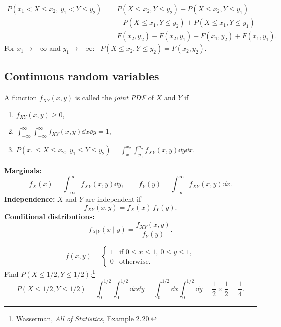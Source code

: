 \begin{center}
\end{center}
\begin{align*}
P(x_1 < X \le x_2,\ y_1 < Y \le y_2) &= P(X \le x_2, Y \le y_2) - P(X \le x_2, Y \le y_1)\\
&\quad - P(X \le x_1, Y \le y_2) + P(X \le x_1, Y \le y_1)\\
&= F(x_2, y_2) - F(x_2, y_1) - F(x_1, y_2) + F(x_1, y_1).
\end{align*}
For $x_1 \to -\infty$ and $y_1 \to -\infty$: \ $P(X \le x_2, Y \le y_2) = F(x_2, y_2)$.

\subsection{Continuous random variables}
A function $f_{XY}(x,y)$ is called the \emph{joint PDF} of $X$ and $Y$ if
\begin{enumerate}[label=(\roman*)]
\item $f_{XY}(x,y) \ge 0$,
\item $\displaystyle\int_{-\infty}^{\infty}\int_{-\infty}^{\infty} f_{XY}(x,y)\dd x\dd y = 1$,
\item $\displaystyle P(x_1 \le X \le x_2,\ y_1 \le Y \le y_2) = \int_{x_1}^{x_2}\int_{y_1}^{y_2} f_{XY}(x,y)\dd y\dd x$.
\end{enumerate}
\textbf{Marginals:}
\[
f_X(x) = \int_{-\infty}^{\infty} f_{XY}(x,y)\dd y, \qquad f_Y(y) = \int_{-\infty}^{\infty} f_{XY}(x,y)\dd x.
\]
\textbf{Independence:} $X$ and $Y$ are independent if
\[
f_{XY}(x,y) = f_X(x)\,f_Y(y).
\]
\textbf{Conditional distributions:}
\[
f_{X|Y}(x \mid y) = \frac{f_{XY}(x,y)}{f_Y(y)}.
\]

\begin{example}
\[
f(x,y) =
\begin{cases}
1 & \text{if } 0 \le x \le 1,\ 0 \le y \le 1,\\
0 & \text{otherwise}.
\end{cases}
\]
Find $P(X \le 1/2, Y \le 1/2)$:\footnote{Wasserman, \emph{All of Statistics}, Example 2.20.}
\[
P(X \le 1/2, Y \le 1/2) = \int_0^{1/2}\int_0^{1/2}\dd x\dd y = \int_0^{1/2}\dd x\int_0^{1/2}\dd y = \frac12\times\frac12 = \frac14.
\]
\end{example}

